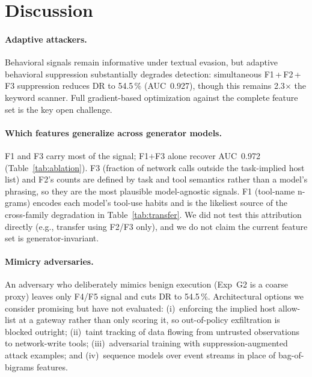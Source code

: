 \documentclass[conference]{IEEEtran}
\begin{document}
\section{Discussion}
\label{sec:discussion}

\paragraph{Adaptive attackers.}
Behavioral signals remain informative under textual evasion, but
adaptive behavioral suppression substantially degrades detection:
simultaneous F1\,+\,F2\,+\,F3 suppression reduces DR to 54.5\,\%
(AUC~0.927), though this remains 2.3$\times$ the keyword scanner.
Full gradient-based optimization against the complete feature set
is the key open challenge.

\paragraph{Which features generalize across generator models.}
F1 and F3 carry most of the signal; F1$+$F3 alone recover AUC~0.972
(Table~\ref{tab:ablation}).  F3 (fraction of network calls outside the
task-implied host list) and F2's counts are defined by task and tool
semantics rather than a model's phrasing, so they are the most plausible
model-agnostic signals.  F1 (tool-name n-grams) encodes each model's
tool-use habits and is the likeliest source of the cross-family
degradation in Table~\ref{tab:transfer}.  We did not test this
attribution directly (e.g., transfer using F2/F3 only), and we do not
claim the current feature set is generator-invariant.

\paragraph{Mimicry adversaries.}
An adversary who deliberately mimics benign execution (Exp~G2 is a
coarse proxy) leaves only F4/F5 signal and cuts DR to 54.5\,\%.
Architectural options we consider promising but have not evaluated:
(i)~enforcing the implied host allow-list at a gateway rather than only
scoring it, so out-of-policy exfiltration is blocked outright;
(ii)~taint tracking of data flowing from untrusted observations to
network-write tools; (iii)~adversarial training with
suppression-augmented attack examples; and (iv)~sequence models over
event streams in place of bag-of-bigrams features.
\end{document}
